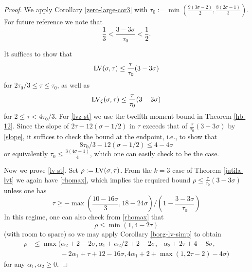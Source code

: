 \begin{proof}  We apply Corollary \ref{zero-large-cor3} with $\tau_0 := \min( \frac{ 9(3\sigma-2)}{2}, \frac{8(2\sigma-1)}{3} )$.  For future reference we note that
\begin{equation}\label{slope}
    \frac{1}{3} < \frac{3-3\sigma}{\tau_0} < \frac{1}{2}.
\end{equation}

It suffices to show that
\begin{equation}\label{lv-st}
 \mathrm{LV}(\sigma,\tau) \leq \frac{\tau}{\tau_0} (3-3\sigma)
\end{equation}
for $2\tau_0/3 \leq \tau \leq \tau_0$, as well as
\begin{equation}\label{lvz-st}
\mathrm{LV}_\zeta(\sigma,\tau) \leq \frac{\tau}{\tau_0} (3-3\sigma)
\end{equation}
for $2 \leq \tau < 4\tau_0/3$.
For \eqref{lvz-st} we use the twelfth moment bound in Theorem \ref{hb-12}.  Since the slope of
$2\tau - 12 (\sigma-1/2)$ in $\tau$ exceeds that of $\frac{\tau}{\tau_0} (3-3\sigma)$ by \eqref{slope}, it suffices to check the bound at the endpoint, i.e., to show that
$$ 8\tau_0/3 - 12 (\sigma-1/2) \leq 4 -4\sigma$$
or equivalently $\tau_0 \leq \frac{3(4\sigma-1)}{4}$, which one can easily check to be the case.

Now we prove \eqref{lv-st}.  Set $\rho := \mathrm{LV}(\sigma,\tau)$.  From the $k=3$ case of Theorem \ref{jutila-lvt} we again have
\eqref{rhomax}, which implies the required bound $\rho \leq \frac{\tau}{\tau_0}(3-3\sigma)$ unless one has
\begin{equation}\label{tau-lower}
    \tau \geq - \max( \frac{10-16\sigma}{3}, 18-24\sigma) / (1 - \frac{3-3\sigma}{\tau_0})
\end{equation}
In this regime, one can also check from \eqref{rhomax} that
$$ \rho \leq \min(1, 4-2\tau)$$
(with room to spare) so we may apply Corollary \ref{borg-lv-simp} to obtain
\begin{equation}\label{40-alt}
\begin{split}
\rho &\leq \max( \alpha_2 + 2 - 2 \sigma, \alpha_1+\alpha_2/2 + 2-2\sigma, -\alpha_2 + 2\tau+4-8\sigma, \\
&\qquad\qquad -2\alpha_1 + \tau + 12 - 16 \sigma, 4\alpha_1 + 2+\max(1,2\tau-2)-4\sigma)
\end{split}
\end{equation}
for any $\alpha_1, \alpha_2 \geq 0$.


\end{proof}
